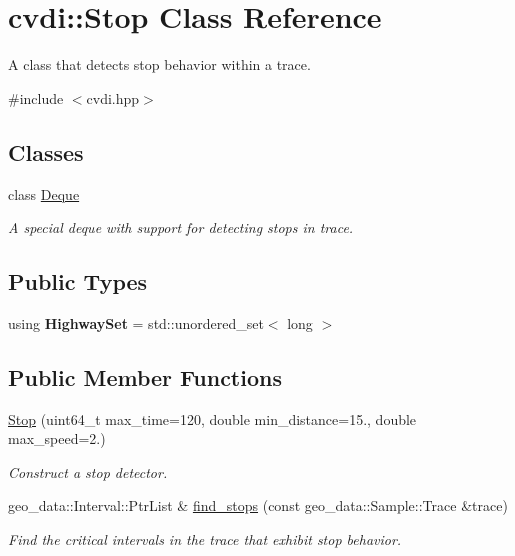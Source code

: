 \hypertarget{classcvdi_1_1Stop}{}\section{cvdi\+:\+:Stop Class Reference}
\label{classcvdi_1_1Stop}


A class that detects stop behavior within a trace.  




{\ttfamily \#include $<$cvdi.\+hpp$>$}

\subsection*{Classes}
\begin{DoxyCompactItemize}
\item 
class \hyperlink{classcvdi_1_1Stop_1_1Deque}{Deque}
\begin{DoxyCompactList}\small\item\em A special deque with support for detecting stops in trace. \end{DoxyCompactList}\end{DoxyCompactItemize}
\subsection*{Public Types}
\begin{DoxyCompactItemize}
\item 
using {\bfseries Highway\+Set} = std\+::unordered\+\_\+set$<$ long $>$\hypertarget{classcvdi_1_1Stop_aa4c4800d1d37bd89d480448f4ef73c32}{}\label{classcvdi_1_1Stop_aa4c4800d1d37bd89d480448f4ef73c32}

\end{DoxyCompactItemize}
\subsection*{Public Member Functions}
\begin{DoxyCompactItemize}
\item 
\hyperlink{classcvdi_1_1Stop_a008996dc88e35a9f9ffd8dd1a68a9cb0}{Stop} (uint64\+\_\+t max\+\_\+time=120, double min\+\_\+distance=15., double max\+\_\+speed=2.)
\begin{DoxyCompactList}\small\item\em Construct a stop detector. \end{DoxyCompactList}\item 
geo\+\_\+data\+::\+Interval\+::\+Ptr\+List \& \hyperlink{classcvdi_1_1Stop_a5313b4db03ad4e79f5210463a4fc48ab}{find\+\_\+stops} (const geo\+\_\+data\+::\+Sample\+::\+Trace \&trace)
\begin{DoxyCompactList}\small\item\em Find the critical intervals in the trace that exhibit stop behavior. \end{DoxyCompactList}\end{DoxyCompactItemize}
